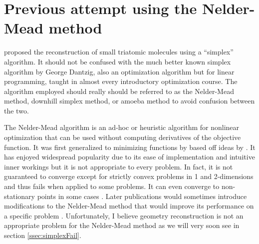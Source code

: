 \section{Previous attempt using the Nelder-Mead method} \label{sec:nelderMead}
\citet{Brichta09} proposed the reconstruction of small triatomic molecules using a ``simplex'' algorithm. It should not be confused with the much better known simplex algorithm by George Dantzig, also an optimization algorithm but for linear programming, taught in almost every introductory optimization course. The algorithm employed should really should be referred to as the Nelder-Mead method, downhill simplex method, or amoeba method to avoid confusion between the two.\footnotemark


The Nelder-Mead algorithm is an ad-hoc or heuristic algorithm for nonlinear optimization that can be used without computing derivatives of the objective function\footnotemark. It was first generalized to minimizing functions by \citet{Nelder65} based off ideas by \citet{Spendley62}. It has enjoyed widespread popularity due to its ease of implementation and intuitive inner workings but it is not appropriate to every problem. In fact, it is not guaranteed to converge except for strictly convex problems in 1 and 2-dimensions \citep{Lagarias98} and thus fails when applied to some problems. It can even converge to non-stationary points in some cases \citep{McKinnon98}. Later publications would sometimes introduce modifications to the Nelder-Mead method that would improve its performance on a specific problem \citet{Wright10}. Unfortunately, I believe geometry reconstruction is not an appropriate problem for the Nelder-Mead method as we will very soon see in section \ref{ssec:simplexFail}.



